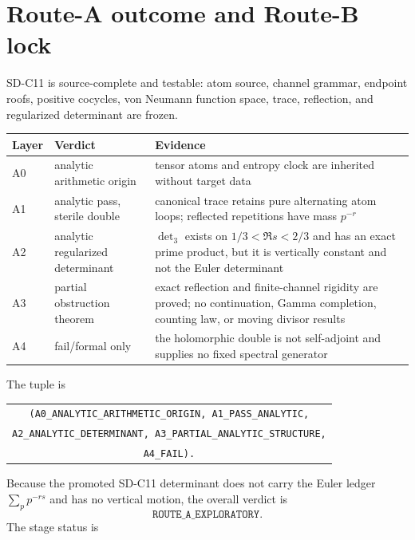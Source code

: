 \section{Route-A outcome and Route-B lock}
\label{sec:route}

SD-C11 is source-complete and testable: atom source, channel grammar, endpoint
roofs, positive cocycles, von Neumann function space, trace, reflection, and
regularized determinant are frozen.

\begin{center}\small
\begin{tabularx}{0.99\textwidth}{L{0.08\textwidth}L{0.25\textwidth}X}
\toprule
Layer & Verdict & Evidence\\\midrule
A0 & analytic arithmetic origin & tensor atoms and entropy clock are inherited without target data\\
A1 & analytic pass, sterile double & canonical trace retains pure alternating atom loops; reflected repetitions have mass $p^{-r}$\\
A2 & analytic regularized determinant & $\det_3$ exists on $1/3<\Re s<2/3$ and has an exact prime product, but it is vertically constant and not the Euler determinant\\
A3 & partial obstruction theorem & exact reflection and finite-channel rigidity are proved; no continuation, Gamma completion, counting law, or moving divisor results\\
A4 & fail/formal only & the holomorphic double is not self-adjoint and supplies no fixed spectral generator\\
\bottomrule
\end{tabularx}\end{center}

The tuple is
\begin{center}\small
\begin{tabular}{c}
\texttt{(A0\_ANALYTIC\_ARITHMETIC\_ORIGIN, A1\_PASS\_ANALYTIC,}\\
\texttt{A2\_ANALYTIC\_DETERMINANT, A3\_PARTIAL\_ANALYTIC\_STRUCTURE,}\\
\texttt{A4\_FAIL).}
\end{tabular}\end{center}
Because the promoted SD-C11 determinant does not carry the Euler ledger
$\sum_pp^{-rs}$ and has no vertical motion, the overall verdict is
\[
 \boxed{\texttt{ROUTE\_A\_EXPLORATORY}.}
\]
The stage status is
\begin{center}\end{center}

